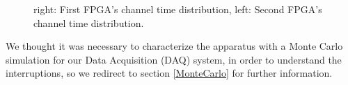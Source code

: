 \documentclass[12pt]{article}
\begin{document}
\begin{figure}[H]
  \hspace{-0.5in}
  \caption{
    \label{fig:1}
    right: First FPGA's channel time distribution, left: Second FPGA's channel time distribution.
  }
\end{figure}
We thought it was necessary to characterize the apparatus with a Monte Carlo simulation for our Data Acquisition (DAQ) system, in order to understand the interruptions,
so we redirect to section \ref{MonteCarlo} for further information.
\end{document}
